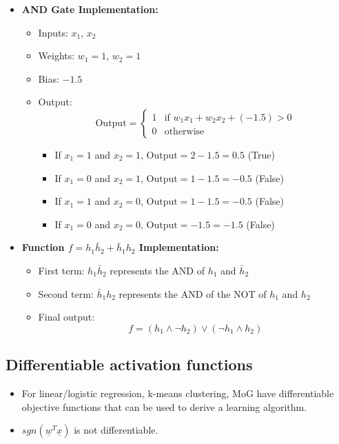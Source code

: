 \begin{definition}
\begin{itemize}
        \item \textbf{AND Gate Implementation:}
        \begin{itemize}
            \item Inputs: \( x_1 \), \( x_2 \)
            \item Weights: \( w_1 = 1 \), \( w_2 = 1 \)
            \item Bias: \( -1.5 \)
            \item Output: 
            \[
            \text{Output} = 
            \begin{cases}
            1 & \text{if } w_1 x_1 + w_2 x_2 + (-1.5) > 0 \\
            0 & \text{otherwise}
            \end{cases}
            \]
            \begin{itemize}
                \item If $x_1 = 1$ and $x_2 = 1$, $\text{Output} = 2 - 1.5 = 0.5$ (True)
                \item If $x_1 = 0$ and $x_2 = 1$, $\text{Output} = 1 - 1.5 = -0.5$ (False)
                \item If $x_1 = 1$ and $x_2 = 0$, $\text{Output} = 1 - 1.5 = -0.5$ (False)
                \item If $x_1 = 0$ and $x_2 = 0$, $\text{Output} = - 1.5 = -1.5$ (False)
            \end{itemize}
        \end{itemize}
        
        \item \textbf{Function \( f = h_1\bar{h}_2 + \bar{h}_1 h_2 \) Implementation:}
        \begin{itemize}
            \item First term: \( h_1 \bar{h}_2 \) represents the AND of \( h_1 \) and \( \bar{h}_2 \)
            \item Second term: \( \bar{h}_1 h_2 \) represents the AND of the NOT of \( h_1 \) and \( h_2 \)
            \item Final output: 
            \[
            f = (h_1 \land \neg h_2) \lor (\neg h_1 \land h_2)
            \]
        \end{itemize}
    \end{itemize}    
\end{definition}

\subsection{Differentiable activation functions}
\begin{intuition}
    \begin{itemize}
        \item For linear/logistic regression, k-means clustering, MoG have differentiable objective functions that can be used to derive a learning algorithm. 
        \item $sgn(\underline{w}^T \underline{x})$ is not differentiable. 
    \end{itemize}
\end{intuition}

